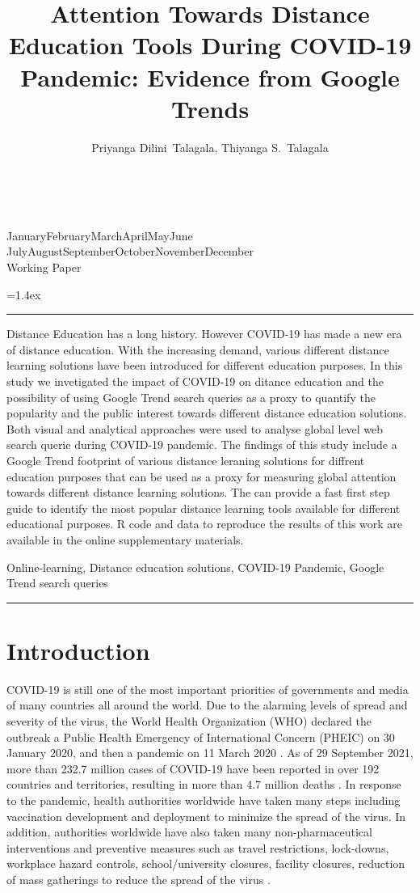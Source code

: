 \documentclass[11pt,a4paper,]{article}
\title{Attention Towards Distance Education Tools During COVID-19 Pandemic: Evidence from Google Trends}
\author{Priyanga Dilini~Talagala, Thiyanga S.~Talagala}
\date{\sf\Date~\Month~\Year}
\makeatletter
\def\Date{\number\day}
\def\Month{\ifcase\month\or
 January\or February\or March\or April\or May\or June\or
 July\or August\or September\or October\or November\or December\fi}
\def\Year{\number\year}
\def\showjel{{\large\textsf{\textbf{JEL classification:}}~\@jel}}
\def\cover{{\sffamily\setcounter{page}{0}
        \thispagestyle{empty}
        \vspace*{2cm}
        \begin{center}
        \fbox{\parbox{14cm}{\begin{onehalfspace}\centering\Huge\vspace*{0.3cm}
                \textsf{\textbf{\expandafter{\@title}}}\vspace{1cm}\par
                \LARGE\@author\end{onehalfspace}
        }}
        \end{center}
        \vfill
                \begin{center}\Large
                \Month~\Year\\[1cm]
                Working Paper \@wp
        \end{center}\vspace*{2cm}}}
\def\pageone{{\sffamily\setstretch{1}%
        \thispagestyle{empty}%
        \vbox to \textheight{%
        \raggedright\baselineskip=1.2cm
     {\fontsize{24.88}{30}\sffamily\textbf{\expandafter{\@title}}}
        \vspace{2cm}\par
        \hspace{1cm}\parbox{14cm}{\sffamily\large\@addresses}\vspace{1cm}\vfill
        \hspace{1cm}{\large\Date~\Month~\Year}\\[1cm]
        \hspace{1cm}\showjel\vss}}}
\def\blindtitle{{\sffamily
     \thispagestyle{plain}\raggedright\baselineskip=1.2cm
     {\fontsize{24.88}{30}\sffamily\textbf{\expandafter{\@title}}}\vspace{1cm}\par
        }}
\def\titlepage{{\cover\newpage\pageone\newpage\blindtitle}}
\let\maketitle\titlepage
\newenvironment{keywords}{\par\vspace{0.5cm}\noindent{\sffamily\textbf{Keywords:}}}{\vspace{0.25cm}\par\hrule\vspace{0.5cm}\par}
\renewenvironment{abstract}{\begin{minipage}{\textwidth}\parskip=1.4ex\noindent
\hrule\vspace{0.1cm}\par{\sffamily\textbf{\abstractname}}\newline}
  {\end{minipage}}
\makeatother
\begin{document}
\maketitle
\begin{abstract}
Distance Education has a long history. However COVID-19 has made a new era of distance education. With the increasing demand, various different distance learning solutions have been introduced for different education purposes. In this study we invetigated the impact of COVID-19 on ditance education and the possibility of using Google Trend search queries as a proxy to quantify the popularity and the public interest towards different distance education solutions. Both visual and analytical approaches were used to analyse global level web search querie during COVID-19 pandemic. The findings of this study include a Google Trend footprint of various distance leraning solutions for diffrent education purposes that can be used as a proxy for measuring global attention towards different distance learning solutions. The can provide a fast first step guide to identify the most popular distance learning tools available for different educational purposes. R code and data to reproduce the results of this work are available in the online supplementary materials.
\end{abstract}
\begin{keywords}
Online-learning, Distance education solutions, COVID-19 Pandemic, Google Trend search queries
\end{keywords}

\hypertarget{introduction}{%
\section{Introduction}\label{introduction}}

COVID-19 is still one of the most important priorities of governments and media of many countries all around the world. Due to the alarming levels of spread and severity of the virus, the World Health Organization (WHO) declared the outbreak a Public Health Emergency of International Concern (PHEIC) on 30 January 2020, and then a pandemic on 11 March 2020 \autocite{world2020timeline}. As of 29 September 2021, more than 232.7 million cases of COVID-19 have been reported in over 192 countries and territories, resulting in more than 4.7 million deaths \autocite{dong2020interactive}. In response to the pandemic, health authorities worldwide have taken many steps including vaccination development and deployment to minimize the spread of the virus. In addition, authorities worldwide have also taken many non-pharmaceutical interventions and preventive measures such as travel restrictions, lock-downs, workplace hazard controls, school/university closures, facility closures, reduction of mass gatherings to reduce the spread of the virus \autocite{chang2020modelling}.
\end{document}
